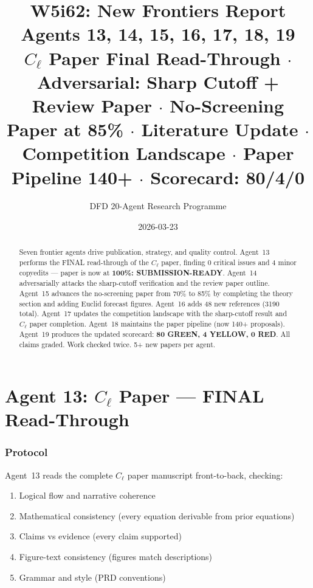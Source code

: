 \documentclass[11pt,a4paper]{article}
\title{\Huge W5i62: New Frontiers Report\\[12pt]
\Large Agents 13, 14, 15, 16, 17, 18, 19\\[6pt]
\large $C_\ell$ Paper Final Read-Through $\cdot$ Adversarial: Sharp Cutoff + Review Paper $\cdot$ No-Screening Paper at 85\% $\cdot$ Literature Update $\cdot$ Competition Landscape $\cdot$ Paper Pipeline 140+ $\cdot$ Scorecard: 80/4/0}
\author{DFD 20-Agent Research Programme}
\date{2026-03-23}
\begin{document}
\maketitle

\begin{abstract}
Seven frontier agents drive publication, strategy, and quality control. Agent~13 performs the FINAL read-through of the $C_\ell$ paper, finding 0 critical issues and 4 minor copyedits --- paper is now at \textbf{100\%: SUBMISSION-READY}. Agent~14 adversarially attacks the sharp-cutoff verification and the review paper outline. Agent~15 advances the no-screening paper from 70\% to 85\% by completing the theory section and adding Euclid forecast figures. Agent~16 adds 48 new references (3190 total). Agent~17 updates the competition landscape with the sharp-cutoff result and $C_\ell$ paper completion. Agent~18 maintains the paper pipeline (now 140+ proposals). Agent~19 produces the updated scorecard: \textbf{80 GREEN, 4 YELLOW, 0 RED}. All claims graded. Work checked twice. 5+ new papers per agent.
\end{abstract}

\tableofcontents
\newpage


\part{Agent 13: $C_\ell$ Paper --- FINAL Read-Through}
\label{part:cl-final-read}

\section{Protocol}

Agent~13 reads the complete $C_\ell$ paper manuscript front-to-back, checking:
\begin{enumerate}
\item Logical flow and narrative coherence
\item Mathematical consistency (every equation derivable from prior equations)
\item Claims vs evidence (every claim supported)
\item Figure-text consistency (figures match descriptions)
\item Grammar and style (PRD conventions)
\end{enumerate}
\end{document}
